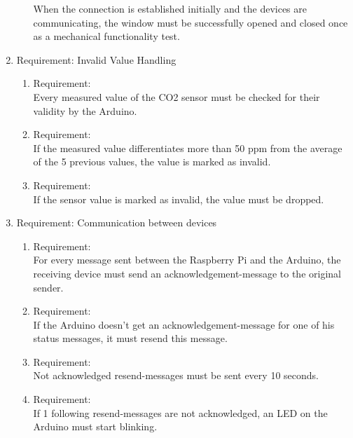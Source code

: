 \begin{enumerate}[label*=\arabic*.]
\begin{enumerate}[label*=\arabic*.]
            When the connection is established initially and the devices are communicating, the window must be successfully opened and closed once as a mechanical functionality test.\\
		\end{enumerate}
		\item \label{req.2}  Requirement:  Invalid Value Handling\\
  	\begin{enumerate}[label*=\arabic*.]
			\item \label{req.2.1}  Requirement:  \\
			Every measured value of the CO2 sensor must be checked for their validity by the Arduino.\\ 
   		\item \label{req.2.2}  Requirement:  \\
			If the measured value differentiates more than 50 ppm from the average of the 5 previous values, the value is marked as invalid.\\
   		\item \label{req.2.3}  Requirement:  \\
			If the sensor value is marked as invalid, the value must be dropped.\\
	  \end{enumerate}
		\item \label{req.3}  Requirement:    Communication between devices  \\
  	\begin{enumerate}[label*=\arabic*.]
			\item \label{req.3.1}  Requirement:  \\
			  For every message sent between the Raspberry Pi and the Arduino, the receiving device must send an acknowledgement-message to the original sender.\\
   		\item \label{req.3.2}  Requirement:  \\
			If the Arduino doesn't get an acknowledgement-message for one of his status messages, it must resend this message.\\
   		\item \label{req.3.3}  Requirement:  \\
			Not acknowledged resend-messages must be sent every 10 seconds.\\
   		\item \label{req.3.4}  Requirement:  \\
			If 1 following resend-messages are not acknowledged, an LED on the Arduino must start blinking.\\ 

\end{enumerate}
\end{enumerate}
